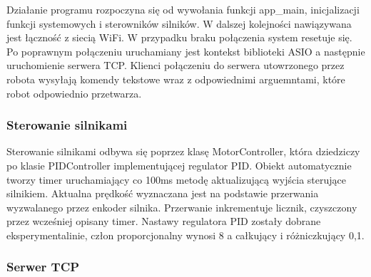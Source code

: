 Działanie programu rozpoczyna się od wywołania funkcji app\_main, inicjalizacji funkcji systemowych i sterowników silników.
W dalszej kolejności nawiązywana jest łączność z siecią WiFi. W przypadku braku połączenia system resetuje się. 
Po poprawnym połączeniu uruchamiany jest kontekst biblioteki ASIO a następnie uruchomienie serwera TCP.
Klienci połączeniu do serwera utowrzonego przez robota wysyłają komendy tekstowe wraz z odpowiednimi arguemntami, które
robot odpowiednio przetwarza. 
\subsubsection{Sterowanie silnikami}
Sterowanie silnikami odbywa się poprzez klasę MotorController, która dziedziczy po klasie PIDController implementującej regulator PID.
Obiekt automatycznie tworzy timer uruchamiający co 100ms metodę aktualizującą wyjścia sterujące silnikiem. 
Aktualna prędkość wyznaczana jest na podstawie przerwania wyzwalanego przez enkoder silnika. Przerwanie inkrementuje licznik, 
czyszczony przez wcześniej opisany timer. Nastawy regulatora PID zostały dobrane eksperymentalinie, człon proporcjonalny wynosi 8 a całkujący i różniczkujący 0,1. 
\subsubsection{Serwer TCP}
